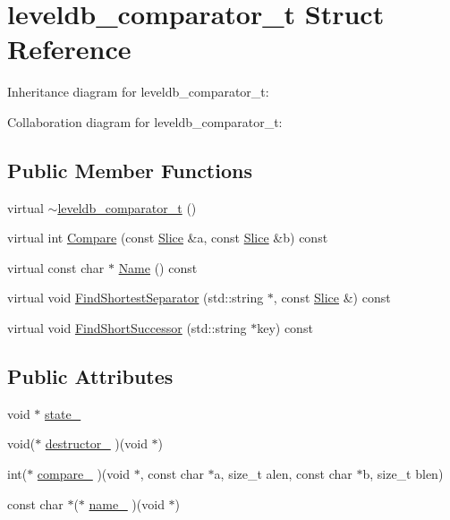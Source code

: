 \hypertarget{structleveldb__comparator__t}{}\section{leveldb\+\_\+comparator\+\_\+t Struct Reference}
\label{structleveldb__comparator__t}


Inheritance diagram for leveldb\+\_\+comparator\+\_\+t\+:


Collaboration diagram for leveldb\+\_\+comparator\+\_\+t\+:
\subsection*{Public Member Functions}
\begin{DoxyCompactItemize}
\item 
virtual \hyperlink{structleveldb__comparator__t_a6717afb2ab1eebb8402b63f00a6d1c35}{$\sim$leveldb\+\_\+comparator\+\_\+t} ()
\item 
virtual int \hyperlink{structleveldb__comparator__t_af340b22c2639696019e13c7bd153d189}{Compare} (const \hyperlink{classleveldb_1_1_slice}{Slice} \&a, const \hyperlink{classleveldb_1_1_slice}{Slice} \&b) const 
\item 
virtual const char $\ast$ \hyperlink{structleveldb__comparator__t_a3b408bc62e1033237b0ef68cfeac7741}{Name} () const 
\item 
virtual void \hyperlink{structleveldb__comparator__t_abbcfac3b28ea84a6ea347be48e1af2f8}{Find\+Shortest\+Separator} (std\+::string $\ast$, const \hyperlink{classleveldb_1_1_slice}{Slice} \&) const 
\item 
virtual void \hyperlink{structleveldb__comparator__t_ad84aa86465a71203cdfd7cac02d85054}{Find\+Short\+Successor} (std\+::string $\ast$key) const 
\end{DoxyCompactItemize}
\subsection*{Public Attributes}
\begin{DoxyCompactItemize}
\item 
void $\ast$ \hyperlink{structleveldb__comparator__t_a720da927befa8098f21437c663d0b0e2}{state\+\_\+}
\item 
void($\ast$ \hyperlink{structleveldb__comparator__t_a757b51457e991ab2219fd5931426bb29}{destructor\+\_\+} )(void $\ast$)
\item 
int($\ast$ \hyperlink{structleveldb__comparator__t_a55906beb72b9f3502c941c16c1187719}{compare\+\_\+} )(void $\ast$, const char $\ast$a, size\+\_\+t alen, const char $\ast$b, size\+\_\+t blen)
\item 
const char $\ast$($\ast$ \hyperlink{structleveldb__comparator__t_a0ed64d60a3e077ed065d745fb6bdee15}{name\+\_\+} )(void $\ast$)
\end{DoxyCompactItemize}


